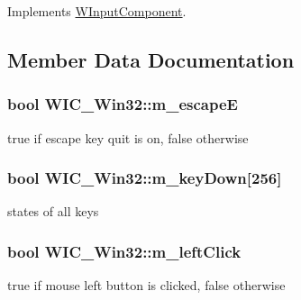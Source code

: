 Implements \hyperlink{class_w_input_component_a5dbfe1f01864bb850567fb668cb937c7}{W\+Input\+Component}.



\subsection{Member Data Documentation}
\subsubsection[{\texorpdfstring{m\+\_\+escapeE}{m_escapeE}}]{\setlength{\rightskip}{0pt plus 5cm}bool W\+I\+C\+\_\+\+Win32\+::m\+\_\+escapeE\hspace{0.3cm}{\ttfamily [protected]}}\hypertarget{class_w_i_c___win32_a41480b502fe374514f4d4d0e53ea2984}{}\label{class_w_i_c___win32_a41480b502fe374514f4d4d0e53ea2984}
true if escape key quit is on, false otherwise 
\subsubsection[{\texorpdfstring{m\+\_\+key\+Down}{m_keyDown}}]{\setlength{\rightskip}{0pt plus 5cm}bool W\+I\+C\+\_\+\+Win32\+::m\+\_\+key\+Down\mbox{[}256\mbox{]}\hspace{0.3cm}{\ttfamily [protected]}}\hypertarget{class_w_i_c___win32_af07652b15f2a84c0a83b262f5431cde6}{}\label{class_w_i_c___win32_af07652b15f2a84c0a83b262f5431cde6}
states of all keys 
\subsubsection[{\texorpdfstring{m\+\_\+left\+Click}{m_leftClick}}]{\setlength{\rightskip}{0pt plus 5cm}bool W\+I\+C\+\_\+\+Win32\+::m\+\_\+left\+Click\hspace{0.3cm}{\ttfamily [protected]}}\hypertarget{class_w_i_c___win32_ab6af7475976aa0cfe19ecc233df5a6e5}{}\label{class_w_i_c___win32_ab6af7475976aa0cfe19ecc233df5a6e5}
true if mouse left button is clicked, false otherwise 

